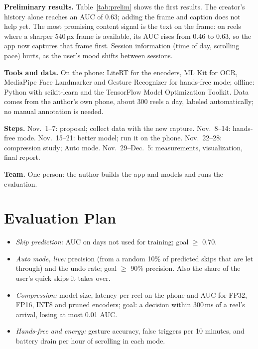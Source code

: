 \documentclass[sigconf,nonacm]{acmart}
\begin{document}
\textbf{Preliminary results.} Table~\ref{tab:prelim} shows the first results. The creator's
history alone reaches an AUC of 0.63; adding the frame and caption does not help yet. The most
promising content signal is the text on the frame: on reels where a sharper 540\,px frame is
available, its AUC rises from 0.46 to 0.63, so the app now captures that frame first.
Session information (time of day, scrolling pace) hurts, as the user's mood shifts between
sessions.

\textbf{Tools and data.} On the phone: LiteRT for the encoders, ML Kit for OCR, MediaPipe
Face Landmarker and Gesture Recognizer for hands-free mode; offline: Python with scikit-learn
and the TensorFlow Model Optimization Toolkit. Data comes from the author's own phone, about
300 reels a day, labeled automatically; no manual annotation is needed.

\textbf{Steps.} Nov.~1--7: proposal; collect data with the new capture. Nov.~8--14: hands-free
mode. Nov.~15--21: better model; run it on the phone. Nov.~22--28: compression study; Auto
mode. Nov.~29--Dec.~5: measurements, visualization, final report.

\textbf{Team.} One person: the author builds the app and models and runs the evaluation.

\section{Evaluation Plan}
\begin{itemize}
  \item \emph{Skip prediction:} AUC on days not used for training; goal $\geq$ 0.70.
  \item \emph{Auto mode, live:} precision (from a random 10\% of predicted skips that are let
    through) and the undo rate; goal $\geq$ 90\% precision. Also the share of the user's quick
    skips it takes over.
  \item \emph{Compression:} model size, latency per reel on the phone and AUC for FP32, FP16,
    INT8 and pruned encoders; goal: a decision within 300\,ms of a reel's arrival, losing at
    most 0.01 AUC.
  \item \emph{Hands-free and energy:} gesture accuracy, false triggers per 10 minutes, and
    battery drain per hour of scrolling in each mode.
\end{itemize}
\end{document}
